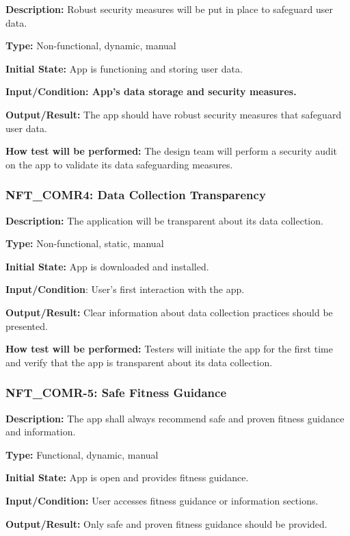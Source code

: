 \documentclass[12pt, titlepage]{article}
\begin{document}
\textbf{Description: }Robust security measures will be put in place to safeguard user data.

\textbf{Type:} Non-functional, dynamic, manual

\textbf{Initial State:} App is functioning and storing user data.

\textbf{Input/Condition: App's data storage and security measures.}

\textbf{Output/Result: }The app should have robust security measures that safeguard user data.

\textbf{How test will be performed:} The design team will perform a security audit on the app to validate its data safeguarding measures.


\subsubsection*{\textbf{NFT\_COMR4: Data Collection Transparency}
}

\textbf{Description: }The application will be transparent about its data collection.

\textbf{Type:} Non-functional, static, manual

\textbf{Initial State: }App is downloaded and installed.

\textbf{Input/Condition}: User's first interaction with the app.

\textbf{Output/Result:} Clear information about data collection practices should be presented.

\textbf{How test will be performed: }Testers will initiate the app for the first time and verify that the app is transparent about its data collection.


\subsubsection*{\textbf{NFT\_COMR-5: Safe Fitness Guidance}
}

\textbf{Description: }The app shall always recommend safe and proven fitness guidance and information.

\textbf{Type:} Functional, dynamic, manual

\textbf{Initial State: }App is open and provides fitness guidance.

\textbf{Input/Condition:} User accesses fitness guidance or information sections.

\textbf{Output/Result: }Only safe and proven fitness guidance should be provided.
\end{document}
